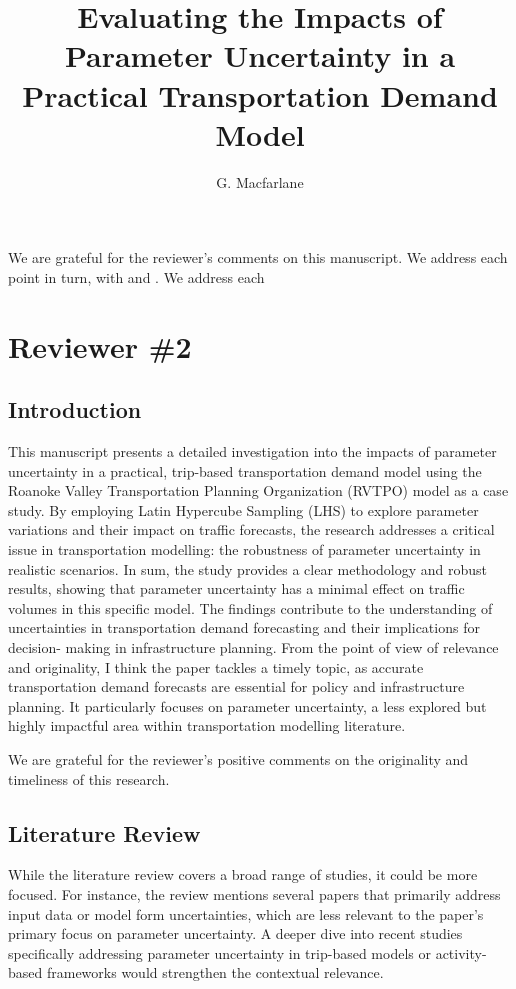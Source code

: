\documentclass{ar2rc}
\title{Evaluating the Impacts of Parameter Uncertainty in a Practical Transportation Demand Model}
\author{G. Macfarlane}
\begin{document}
\maketitle

We are grateful for the reviewer's comments on this manuscript. We address each point in turn, with 
\DIFaddbegin {}\DIFaddend  and 
\DIFdelbegin {}\DIFdelend.
We address each 

\section{Reviewer \#2}

\subsection{Introduction}
\RC This manuscript presents a detailed investigation into the impacts of parameter uncertainty
in a practical, trip-based transportation demand model using the Roanoke Valley
Transportation Planning Organization (RVTPO) model as a case study. By employing Latin
Hypercube Sampling (LHS) to explore parameter variations and their impact on traffic
forecasts, the research addresses a critical issue in transportation modelling: the
robustness of parameter uncertainty in realistic scenarios. In sum, the study provides a
clear methodology and robust results, showing that parameter uncertainty has a minimal
effect on traffic volumes in this specific model. The findings contribute to the understanding
of uncertainties in transportation demand forecasting and their implications for decision-
making in infrastructure planning.
From the point of view of relevance and originality, I think the paper tackles a timely topic,
as accurate transportation demand forecasts are essential for policy and infrastructure
planning. It particularly focuses on parameter uncertainty, a less explored but highly
impactful area within transportation modelling literature.

\AR We are grateful for the reviewer's positive comments on the originality and timeliness 
of this research.

\subsection{Literature Review}
\RC While the literature review covers a broad range of studies, it could be more focused. For
instance, the review mentions several papers that primarily address input data or model
form uncertainties, which are less relevant to the paper’s primary focus on parameter
uncertainty. A deeper dive into recent studies specifically addressing parameter
uncertainty in trip-based models or activity-based frameworks would strengthen the
contextual relevance.
\end{document}
